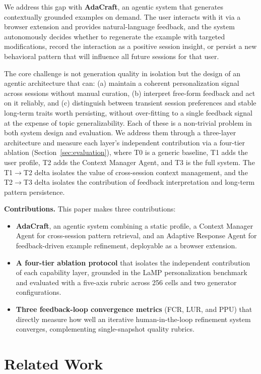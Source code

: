 \documentclass[conference]{IEEEtran}
\begin{document}
We address this gap with \textbf{AdaCraft}, an agentic system that generates contextually grounded examples on demand. The user interacts with it via a browser extension and provides natural-language feedback, and the system autonomously decides whether to regenerate the example with targeted modifications, record the interaction as a positive session insight, or persist a new behavioral pattern that will influence all future sessions for that user.

The core challenge is not generation quality in isolation but the design of an agentic architecture that can: (a) maintain a coherent personalization signal across sessions without manual curation, (b) interpret free-form feedback and act on it reliably, and (c) distinguish between transient session preferences and stable long-term traits worth persisting, without over-fitting to a single feedback signal at the expense of topic generalizability. Each of these is a non-trivial problem in both system design and evaluation. We address them through a three-layer architecture and measure each layer's independent contribution via a four-tier ablation (Section~\ref{sec:evaluation}), where T0 is a generic baseline, T1 adds the user profile, T2 adds the Context Manager Agent, and T3 is the full system. The T1$\to$T2 delta isolates the value of cross-session context management, and the T2$\to$T3 delta isolates the contribution of feedback interpretation and long-term pattern persistence.

\textbf{Contributions.} This paper makes three contributions:
\begin{itemize}
    \item \textbf{AdaCraft}, an agentic system combining a static profile, a Context Manager Agent for cross-session pattern retrieval, and an Adaptive Response Agent for feedback-driven example refinement, deployable as a browser extension.
    \item \textbf{A four-tier ablation protocol} that isolates the independent contribution of each capability layer, grounded in the LaMP personalization benchmark and evaluated with a five-axis rubric across 256 cells and two generator configurations.
    \item \textbf{Three feedback-loop convergence metrics} (FCR, LUR, and PPU) that directly measure how well an iterative human-in-the-loop refinement system converges, complementing single-snapshot quality rubrics.
\end{itemize}

\section{Related Work}
\end{document}
